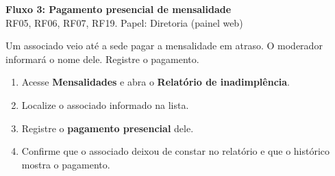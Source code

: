 \documentclass[11pt,a4paper]{article}
\begin{document}
\begin{center}
  {\LARGE\bfseries\color{brandgreen} Fluxo 3: Pagamento presencial de mensalidade}\\[1mm]
  {\large RF05, RF06, RF07, RF19. Papel: Diretoria (painel web)}
\end{center}

\vspace{2mm}
Um associado veio até a sede pagar a mensalidade em atraso. O moderador informará o nome dele.
Registre o pagamento.

\begin{enumerate}[leftmargin=6mm]
  \item Acesse \textbf{Mensalidades} e abra o \textbf{Relatório de inadimplência}.
  \item Localize o associado informado na lista.
  \item Registre o \textbf{pagamento presencial} dele.
  \item Confirme que o associado deixou de constar no relatório e que o histórico mostra o
    pagamento.
\end{enumerate}
\end{document}
